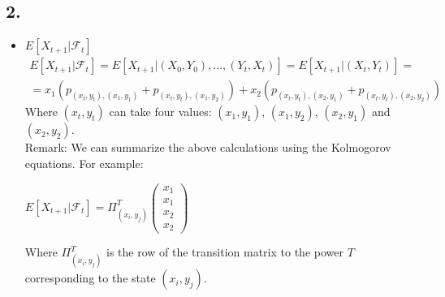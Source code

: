 \subsection*{2.}
\begin{itemize}
    \item $E[X_{t+1}|\mathcal{F}_{t}]$
    \begin{gather*}
        E[X_{t+1}|\mathcal{F}_{t}] = E[X_{t+1}|(X_{0},Y_{0}),...,(Y_{t},X_{t})] = E[X_{t+1}|(X_{t},Y_{t})] =\\
        =x_{1}(p_{(x_{t},y_{t}),(x_{1},y_{1})}+p_{(x_{t},y_{t}),(x_{1},y_{2})})+x_{2}(p_{(x_{t},y_{t}),(x_{2},y_{1})}+p_{(x_{t},y_{t}),(x_{2},y_{2})})
    \end{gather*}
    Where $(x_t,y_t)$ can take four values: $(x_1,y_1)$, $(x_1,y_2)$, $(x_2,y_1)$ and $(x_2,y_2)$.\\
Remark: We can summarize the above calculations using the Kolmogorov equations. For example: 

$E[X_{t+1}|\mathcal{F}_{t}] = \Pi^T_{(x_i, y_j)} \begin{pmatrix}
x_1 \\ x_1 \\ x_2 \\ x_2 
\end{pmatrix}$

 Where $\Pi^T_{(x_i, y_j)}$  is the row of the transition matrix to the power $T$ corresponding to the state $(x_i,y_j)$.


\end{itemize}

